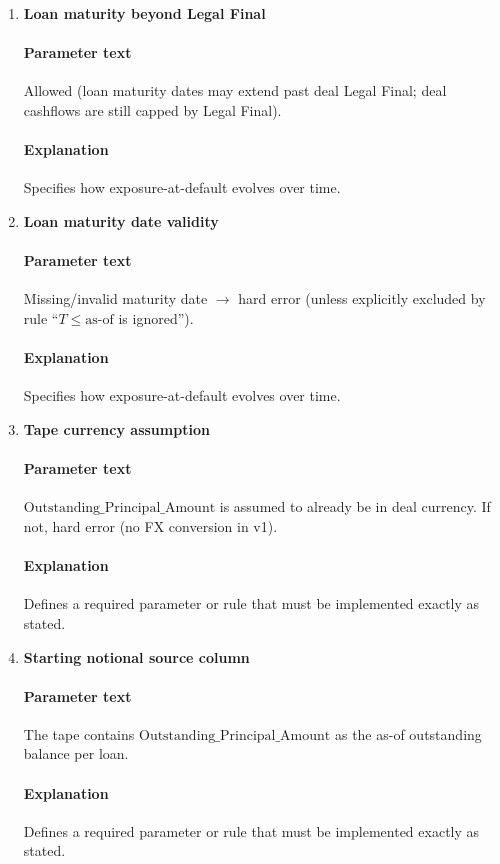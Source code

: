 \documentclass[11pt]{article}
\begin{document}
\begin{enumerate}[label=\arabic*),leftmargin=*,align=left]
\item \textbf{Loan maturity beyond Legal Final}
\paragraph{Parameter text} Allowed (loan maturity dates may extend past deal Legal Final; deal cashflows are still capped by Legal Final).
\paragraph{Explanation} Specifies how exposure-at-default evolves over time.

\item \textbf{Loan maturity date validity}
\paragraph{Parameter text} Missing/invalid maturity date $\rightarrow$ hard error (unless explicitly excluded by rule ``$T \le \text{as-of}$ is ignored'').
\paragraph{Explanation} Specifies how exposure-at-default evolves over time.

\item \textbf{Tape currency assumption}
\paragraph{Parameter text} $\text{Outstanding\_Principal\_Amount}$ is assumed to already be in deal currency. If not, hard error (no FX conversion in v1).
\paragraph{Explanation} Defines a required parameter or rule that must be implemented exactly as stated.

\item \textbf{Starting notional source column}
\paragraph{Parameter text} The tape contains $\text{Outstanding\_Principal\_Amount}$ as the as-of outstanding balance per loan.
\paragraph{Explanation} Defines a required parameter or rule that must be implemented exactly as stated.


\end{enumerate}
\end{document}
